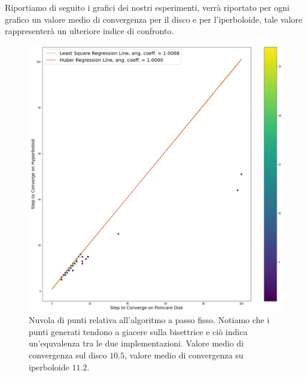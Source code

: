 \documentclass[a4paper, 12pt]{article}
\begin{document}
Riportiamo di seguito i grafici dei nostri esperimenti, verrà riportato per ogni grafico un valore medio di convergenza per il disco e per l'iperboloide, tale valore rappresenterà un ulteriore indice di confronto.\\
\newpage
\begin{figure}[H] %
    \centering\includegraphics[width=1\textwidth]{fixed_step_size.png}
    \caption{Nuvola di punti relativa all'algoritmo a passo fisso. Notiamo che i punti generati tendono a giacere sulla bisettrice e ciò indica un'equvalenza tra le due implementazioni. Valore medio di convergenza sul disco $10.5$, valore medio di convergenza su iperboloide $11.2$.}
\end{figure}
\end{document}
